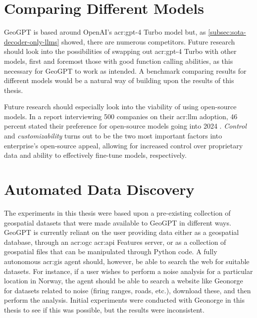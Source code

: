 \section{Comparing Different Models}
\label{sec:comparing-different-models}

GeoGPT is based around OpenAI's \acrshort{acr:gpt}-4 Turbo model but, as \autoref{subsec:sota-decoder-only-llms} showed, there are numerous competitors. Future research should look into the possibilities of swapping out \acrshort{acr:gpt}-4 Turbo with other models, first and foremost those with good function calling abilities, as this necessary for GeoGPT to work as intended. A benchmark comparing results for different models would be a natural way of building upon the results of this thesis.

Future research should especially look into the viability of using open-source models. In a report interviewing 500 companies on their \acrshort{acr:llm} adoption, 46 percent stated their preference for open-source models going into 2024 \citep{wangsarah16ChangesWay2024}. \textit{Control} and \textit{customizability} turns out to be the two most important factors into enterprise's open-source appeal, allowing for increased control over proprietary data and ability to effectively fine-tune models, respectively.

\section{Automated Data Discovery}
\label{sec:automated-data-discovery}

The experiments in this thesis were based upon a pre-existing collection of geospatial datasets that were made available to GeoGPT in different ways. GeoGPT is currently reliant on the user providing data either as a geospatial database, through an \acrshort{acr:ogc} \acrshort{acr:api} Features server, or as a collection of geospatial files that can be manipulated through Python code. A fully autonomous \acrshort{acr:gis} agent should, however, be able to search the web for suitable datasets. For instance, if a user wishes to perform a noise analysis for a particular location in Norway, the agent should be able to search a website like Geonorge for datasets related to noise (firing ranges, roads, etc.), download these, and then perform the analysis. Initial experiments were conducted with Geonorge in this thesis to see if this was possible, but the results were inconsistent.
